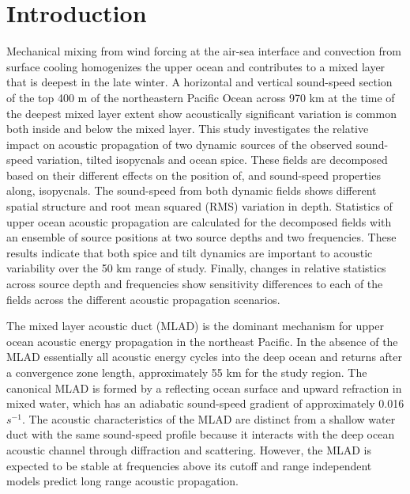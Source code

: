 \documentclass[preprint,NumberedRefs]{JASA}
\begin{document}
\section{\label{sec:intro} Introduction}
Mechanical mixing from wind forcing at the air-sea interface and convection from surface cooling homogenizes the upper ocean and contributes to a mixed layer that is deepest in the late winter.\citep{cole2010seasonal} A horizontal and vertical sound-speed section of the top 400 m of the northeastern Pacific Ocean across 970 km at the time of the deepest mixed layer extent show acoustically significant variation is common both inside and below the mixed layer.\citep{colosi2020observations} This study investigates the relative impact on acoustic propagation of two dynamic sources of the observed sound-speed variation, tilted isopycnals and ocean spice. These fields are decomposed based on their different effects on the position of, and sound-speed properties along, isopycnals.\cite{dzieciuch2004} The sound-speed from both dynamic fields shows different spatial structure and root mean squared (RMS) variation in depth. Statistics of upper ocean acoustic propagation are calculated for the decomposed fields with an ensemble of source positions at two source depths and two frequencies. These results indicate that both spice and tilt dynamics are important to acoustic variability over the 50 km range of study. Finally, changes in relative statistics across source depth and frequencies show sensitivity differences to each of the fields across the different acoustic propagation scenarios.

The mixed layer acoustic duct (MLAD) is the dominant mechanism for upper ocean acoustic energy propagation in the northeast Pacific. In the absence of the MLAD essentially all acoustic energy cycles into the deep ocean and returns after a convergence zone length,\cite{jensen2011computational} approximately 55 km for the study region. The canonical MLAD is formed by a reflecting ocean surface and upward refraction in mixed water, which has an adiabatic sound-speed gradient of approximately 0.016 $s^{-1}$. The acoustic characteristics of the MLAD are distinct from a shallow water duct with the same sound-speed profile because it interacts with the deep ocean acoustic channel through diffraction\citep{porter93} and scattering.\cite{colosi2020observations} However, the MLAD is expected to be stable at frequencies above its cutoff\citep{Urick1982Prop} and range independent models predict long range acoustic propagation.
\end{document}
